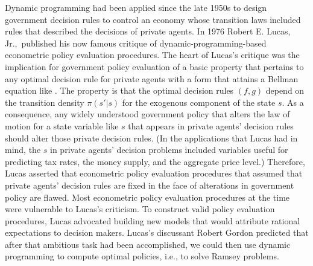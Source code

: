 Dynamic programming had been applied since the late 1950s
to  design government decision rules
to control an economy whose transition laws included
rules that described the decisions of private agents.
 In  1976 Robert E. Lucas, Jr.,\ published his now famous critique of
dynamic-programming-based econometric
policy evaluation procedures.
 The heart of Lucas's critique was
the implication for government policy evaluation of
a basic property that pertains to any optimal decision rule
for private agents with a form
  that attains a Bellman equation like .
The property is that the optimal decision rules $(f,g)$ depend on
the transition density $\pi(s'|s)$ for the exogenous component of
the state $s$. As a consequence, any widely understood government
policy that alters the law of motion for a state variable like
$s$ that appears in private agents' decision rules should alter
those private decision rules.    (In the applications that Lucas
had in mind, the $s$ in private agents' decision problems included
variables useful for predicting tax rates, the money supply, and
the aggregate price level.)  Therefore, Lucas asserted that
econometric policy
evaluation procedures that assumed that private agents' decision
rules are fixed in the face of alterations in government policy
are flawed.
 Most econometric policy evaluation procedures at the time
were vulnerable to Lucas's criticism.
 To construct valid policy evaluation procedures,
 Lucas advocated building new models that
would attribute rational expectations to decision makers.
Lucas's discussant Robert Gordon predicted that after that ambitious
task had been accomplished, we could then use dynamic programming
to compute optimal policies, i.e., to solve Ramsey problems.

\newpage


